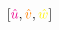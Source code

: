 \documentclass[preview]{standalone}
\begin{document}
$\left[\textcolor{magenta}{\hat{u}}, \textcolor{orange}{\hat{v}}, \textcolor{yellow}{\hat{w}}\right]$
\end{document}
